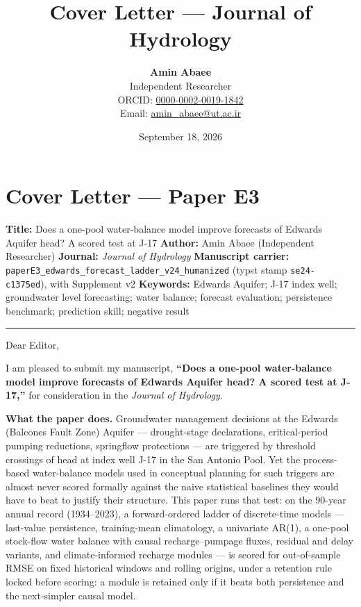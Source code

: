 \documentclass[11pt]{article}
\title{Cover Letter — Journal of Hydrology}
\author{\textbf{Amin Abaee}\\ Independent Researcher\\[2pt] ORCID: \href{https://orcid.org/0000-0002-0019-1842}{0000-0002-0019-1842}\\ Email: \href{mailto:amin_abaee@ut.ac.ir}{amin_abaee@ut.ac.ir}}
\date{September 18, 2026}
\begin{document}
\maketitle

\section{Cover Letter --- Paper E3}\label{cover-letter-paper-e3}

\textbf{Title:} Does a one-pool water-balance model improve forecasts of
Edwards Aquifer head? A scored test at J-17 \textbf{Author:} Amin Abaee
(Independent Researcher) \textbf{Journal:} \emph{Journal of Hydrology}
\textbf{Manuscript carrier:}
\texttt{paperE3\_edwards\_forecast\_ladder\_v24\_humanized} (typst stamp
\texttt{se24-c1375ed}), with Supplement v2 \textbf{Keywords:} Edwards
Aquifer; J-17 index well; groundwater level forecasting; water balance;
forecast evaluation; persistence benchmark; prediction skill; negative
result

\begin{center}\rule{0.5\linewidth}{0.5pt}\end{center}

Dear Editor,

I am pleased to submit my manuscript, \textbf{``Does a one-pool
water-balance model improve forecasts of Edwards Aquifer head? A scored
test at J-17,''} for consideration in the \emph{Journal of Hydrology}.

\textbf{What the paper does.} Groundwater management decisions at the
Edwards (Balcones Fault Zone) Aquifer --- drought-stage declarations,
critical-period pumping reductions, springflow protections --- are
triggered by threshold crossings of head at index well J-17 in the San
Antonio Pool. Yet the process-based water-balance models used in
conceptual planning for such triggers are almost never scored formally
against the naive statistical baselines they would have to beat to
justify their structure. This paper runs that test: on the 90-year
annual record (1934--2023), a forward-ordered ladder of discrete-time
models --- last-value persistence, training-mean climatology, a
univariate AR(1), a one-pool stock-flow water balance with causal
recharge--pumpage fluxes, residual and delay variants, and
climate-informed recharge modules --- is scored for out-of-sample RMSE
on fixed historical windows and rolling origins, under a retention rule
locked before scoring: a module is retained only if it beats both
persistence and the next-simpler causal model.
\end{document}
